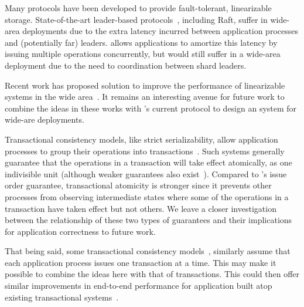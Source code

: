 
Many protocols have been developed to provide fault-tolerant, linearizable storage.
State-of-the-art leader-based
protocols~\cite{ongaro2014raft,lamport1998paxos,oki1988vr},
including Raft, suffer in wide-area deployments due to the extra
latency incurred between application processes and (potentially far)
leaders. \MDL{} allows applications to amortize this latency
by issuing multiple operations concurrently, but \sys{} would
still suffer in a wide-area deployment due to the need to coordination
between shard leaders.


Recent work has proposed solution to improve the performance of
linearizable systems in the wide
area~\cite{mao2008mencius,moraru2013epaxos,burke2020gryff}. It remains
an interesting avenue for future work to combine the ideas in these works with \sys{}'s current protocol to design an \MDL{} system
for wide-are deployments.


Transactional consistency models, like strict serializability,
allow application processes to group their operations into
transactions~\cite{papadimitriou1979serializability}. Such
systems generally guarantee that the operations in a transaction
will take effect atomically, as one indivisible unit (although weaker 
guarantees also exist~\cite{adya1999weakcons}).
Compared to \MDL{}'s issue order guarantee, transactional atomicity 
is stronger since it prevents other processes from observing 
intermediate states where some of the operations in a transaction 
have taken effect but not others. We leave a closer investigation
between the relationship of these two types of guarantees and their
implications for application correctness to future work.

That being said, some transactional consistency
models~\cite{papadimitriou1979serializability,adya1999weakcons}, similarly assume that 
each application process issues one transaction at a time. This may 
make it possible to combine the ideas here with that of transactions. 
This could then offer similar improvements in end-to-end 
performance for application built atop existing transactional 
systems~\cite{thomson2014calvin,mahmoud2013replicatedCommit,zhang2018tapir,mu2014rococo,mu2016janus,kraska2013mdcc,ren2019slog,taft2020crdb,yan2018carousel}.

